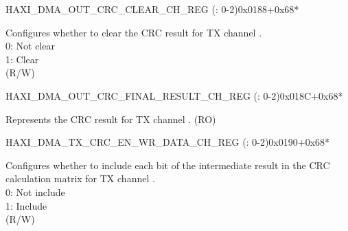 \begin{register}{H}{AXI\_DMA\_OUT\_CRC\_CLEAR\_CH\_REG (: 0-2)}{0x0188+0x68*}\label{regdesc:AXIDMAOUTCRCCLEARCHNREG}
%
%
\regnewline%
\begin{regdesc}\begin{reglist}
\label{fielddesc:AXIDMAOUTCRCCLEARCHNREG}\item [AXI\_DMA\_OUT\_CRC\_CLEAR\_CH\regindex{n}\_REG] Configures whether to clear the CRC result for TX channel .\\
0: Not clear\\
1: Clear\\ (R/W)
\end{reglist}\end{regdesc}
\end{register}


\begin{register}{H}{AXI\_DMA\_OUT\_CRC\_FINAL\_RESULT\_CH\_REG (: 0-2)}{0x018C+0x68*}\label{regdesc:AXIDMAOUTCRCFINALRESULTCHNREG}
%
\regnewline%
\begin{regdesc}\begin{reglist}
\label{fielddesc:AXIDMAOUTCRCFINALRESULTCHN}\item [AXI\_DMA\_OUT\_CRC\_FINAL\_RESULT\_CH\regindex{n}] Represents the CRC result for TX channel . (RO)
\end{reglist}\end{regdesc}
\end{register}


\begin{register}{H}{AXI\_DMA\_TX\_CRC\_EN\_WR\_DATA\_CH\_REG (: 0-2)}{0x0190+0x68*}\label{regdesc:AXIDMATXCRCENWRDATACHNREG}
%
\regnewline%
\begin{regdesc}\begin{reglist}
\label{fielddesc:AXIDMATXCRCENWRDATACHN}\item [AXI\_DMA\_TX\_CRC\_EN\_WR\_DATA\_CH\regindex{n}] Configures whether to include each bit of the intermediate result in the CRC calculation matrix for TX channel .\\
0: Not include\\
1: Include\\ (R/W)
\end{reglist}\end{regdesc}
\end{register}


